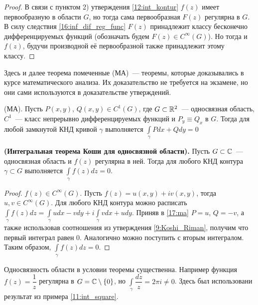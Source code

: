 \begin{proof}
    В связи с пунктом 2) утверждения \ref{12:int_kontur} \(f(z)\) имеет первообразную в области
    \(G\), но тогда сама первообразная \(F(z)\) регулярна в \(G\). В силу следствия
    \ref{16:inf_dif_reg_func} \(F(z)\) принадлежит классу бесконечно дифференцируемых функций
    (обозначать будем \(F(z) \in C^\infty(G)\)). Но тогда и \(f(z)\), будучи производной её
    первообразной также принадлежит этому классу.
\end{proof}



Здесь и далее теорема помеченные (МА)~--- теоремы, которые доказывались в курсе математического
анализа. Их доказательство не требуется на экзамене, но они сами используются в доказательстве
утверждений.

\begin{theorem}\label{17:ma}
    (МА). Пусть \(P(x, y), \, Q(x, y) \in C^1(G)\), где \(G \subset \mathbb{R}^2\)~--- односвязная область,
    \(C^1\)~--- класс непрерывно дифференцируемых функций и \(P_y \equiv Q_x\) в \(G\). Тогда для
    любой замкнутой КНД кривой \(\gamma\) выполняется \(\int\limits_\gamma Pdx + Qdy = 0\)
\end{theorem}

\begin{theorem}
    \textbf{(Интегральная теорема Коши для односвязной области).} Пусть \(G \subset \mathbb{C}\)~---
    односвязная область и \(f(z)\) регулярна в ней. Тогда для любого КНД контура \(\gamma \subset
    G\) выполняется \(\int\limits_\gamma f(z) dz = 0\).
\end{theorem}

\begin{proof}
    \(f(z) \in C^\infty(G)\). Пусть \(f(z) = u(x, y) + i v(x, y)\), тогда \(u, v \in C^\infty(G)\).
    Для любого КНД контура можно расписать \(\int\limits_\gamma f(z) dz = \int\limits_\gamma
    udx - vdy + i\int\limits_\gamma vdx+udy\). Приняв в \ref{17:ma} \(P = u\), \(Q = -v\), а также
    использовав соотношения из утверждения \ref{9:Koshi_Riman}, получим что первый интеграл равен 0.
    Аналогично можно поступить с вторым интегралом. Таким образом, \(\int\limits_\gamma f(z) dz
    = 0\).
\end{proof}

\begin{example}
    Односвязность области в условии теоремы существенна. Например функция \(f(z) = \dfrac{1}{z}\)
    регулярна в \(G = \mathbb{C} \setminus \{0\}\), но \(\int\limits_\gamma \dfrac{dz}{z} = 2\pi i \ne 0\).
    Здесь был использовани результат из примера \ref{11:int_square}.
\end{example}
